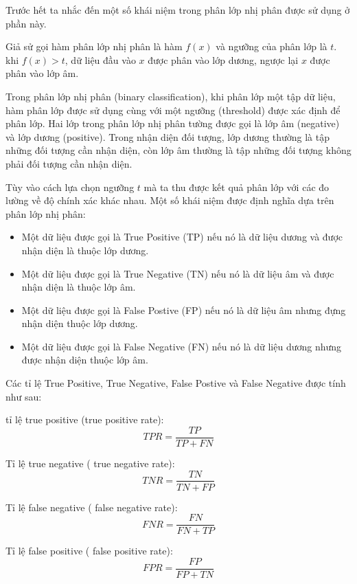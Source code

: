 \documentclass[14pt, oneside, a4paper, openany]{scrartcl}
\begin{document}
Trước hết ta nhắc đến một số khái niệm trong phân lớp nhị phân được sử dụng ở phần này.

Giả sử gọi hàm phân lớp nhị phân là hàm $f(x)$ và ngưỡng của phân lớp là $t$. khi $f(x) > t$, dữ liệu đầu vào $x$ được phân vào lớp dương, ngược lại $x$ được phân vào lớp âm.

Trong phân lớp nhị phân (binary classification), khi phân lớp một tập dữ liệu, hàm phân lớp được sử dụng cùng với một ngưỡng (threshold) được xác định để phân lớp. Hai lớp trong phân lớp nhị phân tường được gọi là lớp âm (negative) và lớp dương (positive). Trong nhận diện đối tượng, lớp dương thường là tập những đối tượng cần nhận diện, còn lớp âm thường là tập những đối tượng không phải đối tượng cần nhận diện.

Tùy vào cách lựa chọn ngưỡng $t$ mà ta thu được kết quả phân lớp với các đo lường về độ chính xác khác nhau. Một số khái niệm được định nghĩa dựa trên phân lớp nhị phân:
\begin{itemize}
	\item Một dữ liệu được gọi là True Positive (TP) nếu nó là dữ liệu dương và được nhận diện là thuộc lớp dương.
	\item Một dữ liệu được gọi là True Negative (TN) nếu nó là dữ liệu âm và được nhận diện là thuộc lớp âm.
	\item Một dữ liệu được gọi là False Postive (FP) nếu nó là dữ liệu âm nhưng đựng nhận diện thuộc lớp dương.
	\item Một dữ liệu được gọi là False Negative (FN) nếu nó là dữ liệu dương nhưng được nhận diện thuộc lớp âm.
\end{itemize}
Các tỉ lệ True Positive, True Negative, False Postive và False Negative được tính như sau:

tỉ lệ true positive (true positive rate):
\begin{equation}
	 TPR = \frac{TP}{TP + FN}
\end{equation}

Tỉ lệ true negative ( true negative rate):
\begin{equation}
	TNR = \frac{TN}{TN + FP}
\end{equation}

Tỉ lệ false negative ( false negative rate):
\begin{equation}
FNR = \frac{FN}{FN + TP}
\end{equation}

Tỉ lệ false positive ( false positive rate):
\begin{equation}
FPR = \frac{FP}{FP + TN}
\end{equation}
\end{document}
